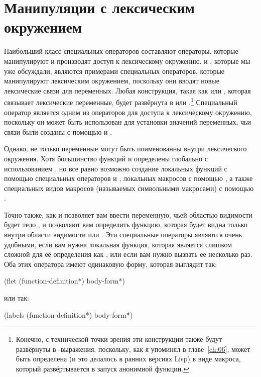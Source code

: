 \section{Манипуляции с лексическим окружением}

Наибольший класс специальных операторов составляют операторы, которые манипулируют и
производят доступ к лексическому окружению.  и , которые мы уже
обсуждали, являются примерами специальных операторов, которые манипулируют лексическим
окружением, поскольку они вводят новые лексические связи для переменных.  Любая
конструкция, такая как  или , которая связывает лексические
переменные, будет развёрнута в  или .\footnote{Конечно, с технической
  точки зрения эти конструкции также будут развёрнуты в -выражения,
  поскольку, как я упоминял в главе~\ref{ch:06},  может быть определена (и это
делалось в ранних версиях Lisp) в виде макроса, который развёртывается в запуск анонимной
функции.} Специальный оператор  является одним из операторов для доступа к
лексическому окружению, поскольку он может быть использован для установки значений
переменных, чьи связи были созданы с помощью  и .

Однако, не только переменные могут быть поименованны внутри лексического окружения.  Хотя
большинство функций и определены глобально с использованием , но все равно
возможно создание локальных функций с помощью специальных операторов  и
, локальных макросов с помощью , а также специальных видов
макросов (называемых символьными макросами) с помощью .

Точно также, как и  позволяет вам ввести переменную, чьей областью видимости
будет тело ,  и  позволяют вам определить функцию,
которая будет видна только внутри области видимости  или .  Эти
специальные операторы являются очень удобными, если вам нужна локальная функция, которая
является слишком сложной для её определения как , или если вам нужно вызвать
ее несколько раз.  Оба этих оператора имеют одинаковую форму, которая выглядит так:

\begin{myverb}
(flet (function-definition*)
  body-form*)
\end{myverb}

\noindent{}или так:

\begin{myverb}
(labels (function-definition*)
  body-form*)
\end{myverb}

